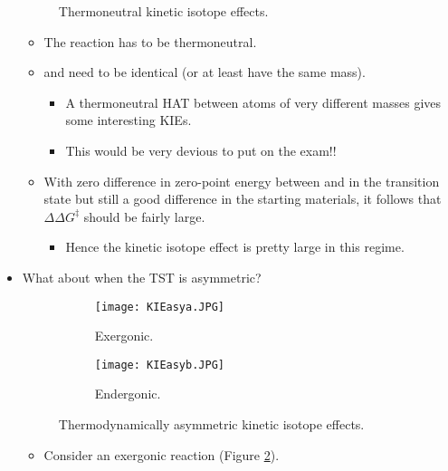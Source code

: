 \documentclass[../notes.tex]{subfiles}
\begin{document}
\begin{itemize}
\begin{figure}[h!]
        \caption{Thermoneutral kinetic isotope effects.}
        \label{fig:KIEtherm}
    \end{figure}
    \begin{itemize}
        \item The reaction has to be thermoneutral.
        \item {} and  need to be identical (or at least have the same mass).
        \begin{itemize}
            \item A thermoneutral HAT between atoms of very different masses gives some interesting KIEs.
            \item This would be very devious to put on the exam!!
        \end{itemize}
        \item With zero difference in zero-point energy between  and  in the transition state but still a good difference in the starting materials, it follows that $\Delta\Delta G^\ddagger$ should be fairly large.
        \begin{itemize}
            \item Hence the kinetic isotope effect is pretty large in this regime.
        \end{itemize}
    \end{itemize}
    \item What about when the TST is asymmetric?
    \begin{figure}[h!]
        \centering
        \begin{subfigure}[b]{0.4\linewidth}
            \centering
            \texttt{[image: KIEasya.JPG]}
            \caption{Exergonic.}
            \label{fig:KIEasya}
        \end{subfigure}
        \begin{subfigure}[b]{0.4\linewidth}
            \centering
            \texttt{[image: KIEasyb.JPG]}
            \caption{Endergonic.}
            \label{fig:KIEasyb}
        \end{subfigure}
        \caption{Thermodynamically asymmetric kinetic isotope effects.}
        \label{fig:KIEasy}
    \end{figure}
    \begin{itemize}
        \item Consider an exergonic reaction (Figure \ref{fig:KIEasya}).

\end{itemize}
\end{itemize}
\end{document}

